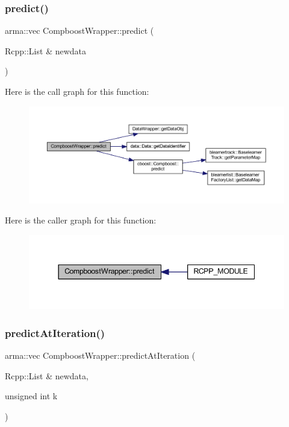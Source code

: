 \subsubsection{\texorpdfstring{predict()}{predict()}}
{\footnotesize\ttfamily arma\+::vec Compboost\+Wrapper\+::predict (\begin{DoxyParamCaption}\item[{Rcpp\+::\+List \&}]{newdata }\end{DoxyParamCaption})\hspace{0.3cm}{\ttfamily [inline]}}

Here is the call graph for this function\+:\nopagebreak
\begin{figure}[H]
\begin{center}
\leavevmode
\includegraphics[width=350pt]{class_compboost_wrapper_a62637fbc8c50160b411b817b7e99432e_cgraph}
\end{center}
\end{figure}
Here is the caller graph for this function\+:\nopagebreak
\begin{figure}[H]
\begin{center}
\leavevmode
\includegraphics[width=344pt]{class_compboost_wrapper_a62637fbc8c50160b411b817b7e99432e_icgraph}
\end{center}
\end{figure}
\mbox{\label{class_compboost_wrapper_a72b9c303a13fb3f6f8346c0af0796496}} 
\subsubsection{\texorpdfstring{predict\+At\+Iteration()}{predictAtIteration()}}
{\footnotesize\ttfamily arma\+::vec Compboost\+Wrapper\+::predict\+At\+Iteration (\begin{DoxyParamCaption}\item[{Rcpp\+::\+List \&}]{newdata,  }\item[{unsigned int}]{k }\end{DoxyParamCaption})\hspace{0.3cm}{\ttfamily [inline]}}


